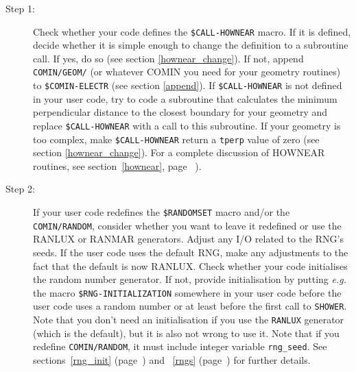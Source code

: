 \begin{description}

\item[Step 1:]
Check whether your code defines the {\tt \$CALL-HOWNEAR} macro.
If it is defined, decide whether it is simple enough to change 
the definition to a subroutine call. If yes, do so (see section 
\ref{hownear_change}). If not, append {\tt COMIN/GEOM/} (or whatever COMIN you
need for your geometry routines) to 
{\tt \$COMIN-ELECTR} (see section \ref{append}).
If {\tt \$CALL-HOWNEAR} is not defined in your user code, try 
to code a subroutine that calculates the minimum perpendicular 
distance to the closest boundary for your 
geometry and replace {\tt \$CALL-HOWNEAR} 
with a call to this subroutine. If your geometry is too 
complex, make {\tt \$CALL-HOWNEAR} return a {\tt tperp} value of zero 
(see section \ref{hownear_change}). 
For a complete discussion of HOWNEAR routines,
see section~\ref{hownear}, page ~\pageref{hownear}).
  

\item[Step 2:]
  
If your user code redefines the {\tt \$RANDOMSET} macro and/or the {\tt
COMIN/RANDOM}, consider whether you
want to leave it redefined or use the RANLUX or RANMAR generators. Adjust
any I/O related to the RNG's seeds.  If the user code uses the default RNG,
make any adjustments to the fact that the default is now RANLUX.
Check whether your code initialises the random number generator. 
If not, provide initialisation by putting {\em e.g.} the 
macro {\tt \$RNG-INITIALIZATION} somewhere in your user code 
before the user code uses a random number or at least before
the first call to {\tt SHOWER}. Note that you don't 
need an initialisation if you use the {\tt RANLUX} generator (which is the
default), but it is also not wrong to use it. Note that if you redefine
{\tt COMIN/RANDOM}, it must include integer variable {\tt rng\_seed}.
See sections~\ref{rng_init} 
(page~\pageref{rng_init}) and ~\ref{rngs} (page~\pageref{rngs})
for further details.


\end{description}
